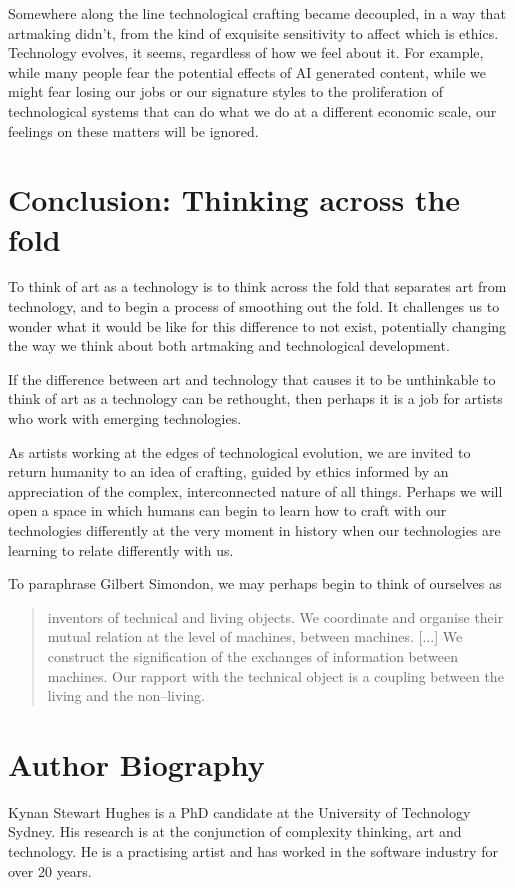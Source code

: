 \documentclass[letter:wpaper]{article}
\begin{document}
    Somewhere along the line technological crafting became decoupled, in a way that artmaking didn't, from the kind of exquisite sensitivity to affect which is ethics. Technology evolves, it seems, regardless of how we feel about it. For example, while many people fear the potential effects of AI generated content, while we might fear losing our jobs or our signature styles to the proliferation of technological systems that can do what we do at a different economic scale, our feelings on these matters will be ignored.
    
\section{Conclusion: Thinking across the fold}

    To think of art as a technology is to think across the fold that separates art from technology, and to begin a process of smoothing out the fold. It challenges us to wonder what it would be like for this difference to not exist, potentially changing the way we think about both artmaking and technological development.
    
    If the difference between art and technology that causes it to be unthinkable to think of art as a technology can be rethought, then perhaps it is a job for artists who work with emerging technologies. 
    
    As artists working at the edges of technological evolution, we are invited to return humanity to an idea of crafting, guided by ethics informed by an appreciation of the complex, interconnected nature of all things. Perhaps we will open a space in which humans can begin to learn how to craft with our technologies differently at the very moment in history when our technologies are learning to relate differently with us.
    
    To paraphrase Gilbert Simondon, we may perhaps begin to think of ourselves as

    \begin{quote}
        inventors of technical and living objects. We coordinate and organise their mutual relation at the level of machines, between machines. [...] We construct the signification of the exchanges of information between machines. Our rapport with the technical object is a coupling between the living and the non–living. \citep[p.xvi]{SimondonOnThMdOfExstncOfTechnclObjcts1980}
    \end{quote}
    



\section{Author Biography}

Kynan Stewart Hughes is a PhD candidate at the University of Technology Sydney. His research is at the conjunction of complexity thinking, art and technology. He is a practising artist and has worked in the software industry for over 20 years. 
\end{document}
